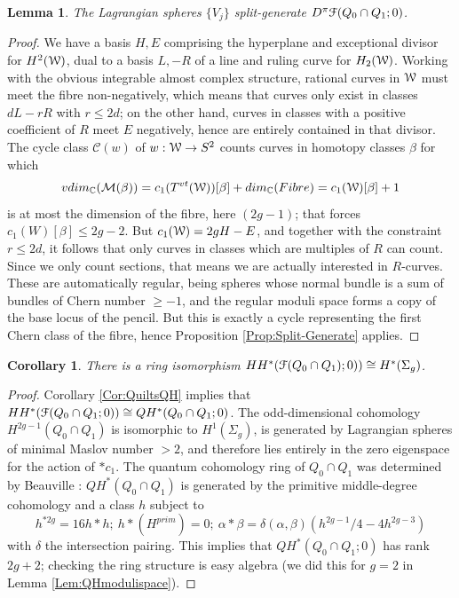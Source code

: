 \documentclass[reqno,10pt]{amsart}
\numberwithin{equation}{section}
\newcommand{\bC}{{\mathbb C}}
\newcommand{\scrF}{\EuScript{F}}
\newcommand{\scrW}{\EuScript{W}}
\newtheorem{Corollary}[thm]{Corollary}
\newtheorem{Lemma}[thm]{Lemma}
\theoremstyle{remark}
\begin{document}
\begin{Lemma}\label{Lem:SplitGenQuadricIntersection}
The Lagrangian spheres $\{V_j\}$ split-generate $D^{\pi}\scrF(Q_0 \cap Q_1;0)$.
\end{Lemma}

\begin{proof}
We have a basis $H,E$ comprising the hyperplane and exceptional divisor for $H^2(\scrW)$, dual to a basis $L,-R$ of a line and ruling curve for $H_2(\scrW)$.   Working with the obvious integrable almost complex structure, rational curves in $\scrW$ must meet the fibre non-negatively, which means that curves only exist in classes $dL-rR$ with $r \leq 2d$; on the other hand, curves in classes with a positive coefficient of $R$ meet $E$ negatively, hence are entirely contained in that divisor.  The cycle class $\mathcal{C}(w)$ of $w:\scrW\rightarrow S^2$ counts curves in homotopy classes $\beta$ for which
\[
vdim_{\bC}(\mathcal{M}(\beta)) = c_1(T^{vt}(\scrW))[\beta] + dim_{\bC}(Fibre) = c_1(\scrW)[\beta]+1
\]
is at most the dimension of the fibre, here $(2g-1)$; that forces $c_1(W)[\beta] \leq 2g-2$. But $c_1(\scrW) = 2gH-E$, and together with the constraint $r \leq 2d$, it follows that only curves in classes which are multiples of $R$ can count. Since we only count sections, that means we are actually interested in $R$-curves. These are automatically regular, being spheres whose normal bundle is a sum of bundles of Chern number $\geq -1$, and the regular moduli space forms a copy of the base locus of the pencil. But this is exactly a cycle representing the first Chern class of the fibre, hence Proposition \ref{Prop:Split-Generate} applies.
\end{proof}


\begin{Corollary} \label{Cor:QHIntersectQuadrics}
There is a ring isomorphism $HH^*(\scrF(Q_0 \cap Q_1);0)) \cong H^*(\Sigma_g)$.
\end{Corollary}

\begin{proof}
Corollary \ref{Cor:QuiltsQH} implies that $HH^*(\scrF(Q_0 \cap Q_1;0)) \cong QH^*(Q_0 \cap Q_1;0)$.  The odd-dimensional cohomology  $H^{2g-1}(Q_0 \cap Q_1)$ is isomorphic to $H^1(\Sigma_g)$, is generated by Lagrangian spheres of minimal Maslov number $>2$, and therefore lies entirely in the zero eigenspace for the action of $\ast c_1$. The quantum cohomology ring of $Q_0 \cap Q_1$ was determined by  Beauville \cite{Beauville}: $QH^*(Q_0 \cap Q_1)$ is generated by the primitive middle-degree cohomology and a class $h$ subject to
\[
h^{\ast 2g} = 16 h\ast h; \ h\ast (H^{prim}) =0; \ \alpha \ast \beta = \delta(\alpha,\beta) (h^{2g-1}/4-4h^{2g-3})
\]
with $\delta$ the intersection pairing. This implies that $QH^*(Q_0\cap Q_1;0)$ has rank  $2g+2$; checking the ring structure is easy algebra (we did this for $g=2$ in Lemma \ref{Lem:QHmodulispace}).  
\end{proof}
\end{document}

